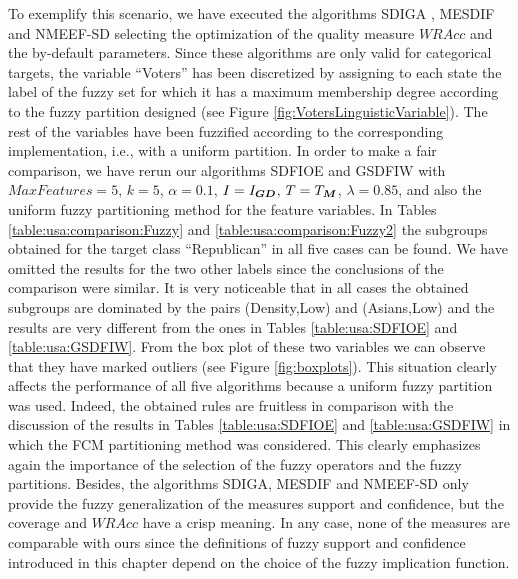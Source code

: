 To exemplify this scenario, we have executed the algorithms SDIGA \cite{delJesus2007}, MESDIF \cite{Berlanga2006,delJesus2007B,Carmona2011} and NMEEF-SD \cite{Carmona2010} selecting the optimization of the quality measure $WRAcc$ and the by-default parameters. Since these algorithms are only valid for categorical targets, the variable ``Voters'' has been discretized by assigning to each state the label of the fuzzy set for which it has a maximum membership degree according to the fuzzy partition designed (see Figure \ref{fig:VotersLinguisticVariable}). The rest of the variables have been fuzzified according to the corresponding implementation, i.e., with a uniform partition. In order to make a fair comparison, we have rerun our algorithms SDFIOE and GSDFIW with $MaxFeatures=5$, $k=5$, $\alpha=0.1$, $I=I_{\bm{GD}}$, $T=T_{\bm{M}}$, $\lambda=0.85$, and also the uniform fuzzy partitioning method for the feature variables. In Tables \ref{table:usa:comparison:Fuzzy} and \ref{table:usa:comparison:Fuzzy2} the subgroups obtained for the target class ``Republican'' in all five cases can be found. We have omitted the results for the two other labels since the conclusions of the comparison were similar. It is very noticeable that in all cases the obtained subgroups are dominated by the pairs (Density,Low) and (Asians,Low) and the results are very different from the ones in Tables \ref{table:usa:SDFIOE} and \ref{table:usa:GSDFIW}. From the box plot of these two variables we can observe that they have marked outliers (see Figure \ref{fig:boxplots}). This situation clearly affects the performance of all five algorithms because a uniform fuzzy partition was used. Indeed, the obtained rules are fruitless in comparison with the discussion of the results in Tables \ref{table:usa:SDFIOE} and \ref{table:usa:GSDFIW} in which the FCM partitioning method was considered. This clearly emphasizes again the importance of the selection of the fuzzy operators and the fuzzy partitions. Besides, the algorithms SDIGA, MESDIF and NMEEF-SD only provide the fuzzy generalization of the measures support and confidence, but the coverage and $WRAcc$ have a crisp meaning. In any case, none of the measures are comparable with ours since the definitions of fuzzy support and confidence introduced in this chapter depend on the choice of the fuzzy implication function.

